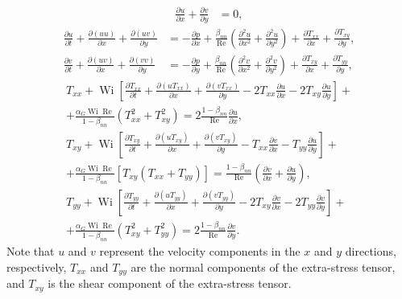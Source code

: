 \documentclass[preprint, 12pt]{elsarticle}
\begin{document}
\begin{align}
    \frac{\partial u}{\partial x}+\frac{\partial v}{\partial y}&=0,\label{cont_bidime}
\end{align}
\begin{subequations}
\begin{align}
    \frac{\partial u}{\partial t}+\frac{\partial(u u)}{\partial x}+\frac{\partial(u v)}{\partial y} &= -\frac{\partial p}{\partial x}+\frac{\beta_{nn}}{\operatorname{Re}}\left(\frac{\partial^2 u}{\partial x^2}+\frac{\partial^2 u}{\partial y^2}\right)+\frac{\partial T_{x x}}{\partial x}+\frac{\partial T_{x y}}{\partial y},\label{movi_x_bidime} \\[7mm]
    \frac{\partial v}{\partial t} + \frac{\partial(u v)}{\partial x} + \frac{\partial(v v)}{\partial y} &= -\frac{\partial p}{\partial y}+\frac{\beta_{nn}}{\operatorname{Re}}\left(\frac{\partial^2 v}{\partial x^2}+\frac{\partial^2 v}{\partial y^2}\right)+\frac{\partial T_{x y}}{\partial x}+\frac{\partial T_{yy}}{\partial y},\label{movi_y_bidime}
\end{align}
\end{subequations}
\begin{subequations}
\begin{align}
    T_{xx} + \operatorname{Wi}\left[\frac{\partial T_{xx}}{\partial t} + \frac{\partial (uT_{xx})}{\partial x} + \frac{\partial (vT_{xx})}{\partial y} - 2T_{xx}\frac{\partial u}{\partial x} - 2T_{xy}\frac{\partial u}{\partial y}\right] + \nonumber\\ + \frac{\alpha_{G}\operatorname{Wi}\operatorname{Re}}{1 - \beta_{nn}}\left(T_{xx}^{2} + T_{xy}^{2}\right) = 2 \frac{1 - \beta_{nn}}{\operatorname{Re}}\frac{\partial u}{\partial x},\label{eq_gies_txx}\\[7mm]
    T_{xy} + \operatorname{Wi}\left[\frac{\partial T_{xy}}{\partial t} + \frac{\partial (uT_{xy})} {\partial x} + \frac{\partial (vT_{xy})}{\partial y} - T_{xx}\frac{\partial v}{\partial x} - T_{yy}\frac{\partial u}{\partial y}\right] + \nonumber \\ + \frac{\alpha_{G}\operatorname{Wi}\operatorname{Re}}{1 - \beta_{nn}}\left[T_{xy}\left(T_{xx} + T_{yy}\right)\right] = \frac{1 - \beta_{nn}}{\operatorname{Re}}\left(\frac{\partial v}{\partial x} + \frac{\partial u}{\partial y}\right),\label{eq_gies_txy}\\[7mm]
    T_{yy} + \operatorname{Wi}\left[\frac{\partial T_{yy}}{\partial t} + \frac{\partial (uT_{yy})}{\partial x} + \frac{\partial (vT_{yy})}{\partial y} - 2T_{xy}\frac{\partial v}{\partial x} - 2T_{yy}\frac{\partial v}{\partial y}\right] + \nonumber \\ + \frac{\alpha_{G}\operatorname{Wi}\operatorname{Re}}{1 - \beta_{nn}}\left(T_{xy}^{2} + T_{yy}^{2}\right) = 2\frac{1 - \beta_{nn}}{\operatorname{Re}}\frac{\partial v}{\partial y}.\label{eq_gies_tyy}
\end{align}
\end{subequations}
Note that $u$ and $v$ represent the velocity components in the $x$ and $y$ directions, respectively, $T_{xx}$ and $T_{yy}$ are the normal components of the extra-stress tensor, and $T_{xy}$ is the shear component of the extra-stress tensor. 
\end{document}
